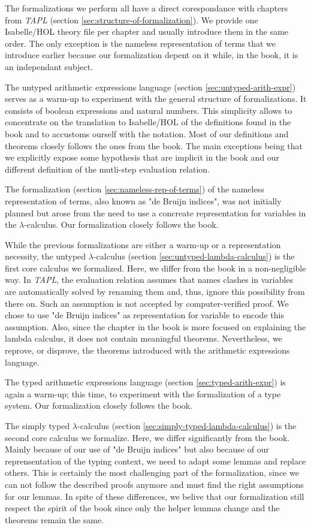 The formalizations we perform all have a direct corespondance with chapters from \emph{TAPL}
(section \ref{sec:structure-of-formalization}). We provide one Isabelle/HOL theory file per chapter
and usually introduce them in the same order. The only exception is the nameless representation of
terms that we introduce earlier because our formalization depent on it while, in the book, it is an
independant subject.

The untyped arithmetic expressions language (section \ref{sec:untyped-arith-expr}) serves as a
warm-up to experiment with the general structure of formalizations. It consists of boolean
expressions and natural numbers. This simplicity allows to concentrate on the translation to
Isabelle/HOL of the definitions found in the book and to accustoms ourself with the notation. Most
of our definitions and theorems closely follows the ones from the book. The main exceptions being
that we explicitly expose some hypothesis that are implicit in the book and our different definition
of the mutli-step evaluation relation.

The formalization (section \ref{sec:nameless-rep-of-terms}) of the nameless representation of terms,
also known as "de Bruijn indices", was not initially planned but arose from the need to use a
concreate representation for variables in the $\lambda$-calculus. Our formalization closely follows
the book.

While the previous formalizations are either a warm-up or a representation necessity, the untyped
$\lambda$-calculus (section \ref{sec:untyped-lambda-calculus}) is the first core calculus we
formalized. Here, we differ from the book in a non-negligible way. In \emph{TAPL}, the evaluation
relation assumes that names clashes in variables are automatically solved by renaming them and,
thus, ignore this possibility from there on. Such an assumption is not accepted by computer-verified
proof. We chose to use "de Bruijn indices" as representation for variable to encode this
assumption. Also, since the chapter in the book is more focused on explaining the lambda calculus,
it does not contain meaningful theorems. Nevertheless, we reprove, or disprove, the theorems
introduced with the arithmetic expressions language.

The typed arithmetic expressions language (section \ref{sec:typed-arith-expr}) is again a warm-up;
this time, to experiment with the formalization of a type system. Our formalization closely follows
the book.

The simply typed $\lambda$-calculus (section \ref{sec:simply-typed-lambda-calculus}) is the second
core calculus we formalize. Here, we differ significantly from the book. Mainly because of our use
of "de Bruijn indices" but also because of our reprensentation of the typing context, we need to
adapt some lemmas and replace others. This is certainly the most challenging part of the
formalization, since we can not follow the described proofs anymore and must find the right
assumptions for our lemmas.  In spite of these differences, we belive that our formalization still
respect the spirit of the book since only the helper lemmas change and the theorems remain the same.

